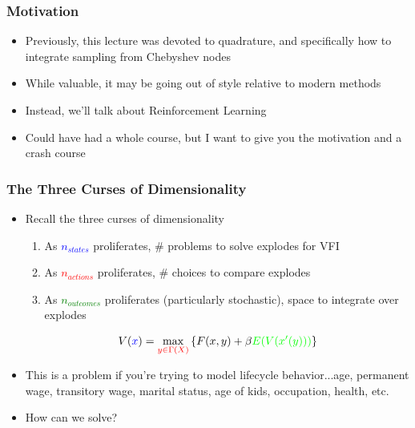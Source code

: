 \documentclass{beamer}
\author{Trevor Gallen}
\date{}
\begin{document}
\begin{frame}
\titlepage
\end{frame}

\begin{frame}
\frametitle[alignment=center]{Motivation}
\begin{itemize}
\item Previously, this lecture was devoted to quadrature, and specifically how to integrate sampling from Chebyshev nodes
\bigskip
\item While valuable, it may be going out of style relative to modern methods
\bigskip
\item Instead, we'll talk about Reinforcement Learning
\bigskip
\item Could have had a whole course, but I want to give you the motivation and a crash course
\end{itemize}
\end{frame}


\begin{frame}
\frametitle[alignment=center]{The Three Curses of Dimensionality}
\begin{itemize}
\item Recall the three curses of dimensionality
\begin{enumerate}
\item As \textcolor{blue}{$n_{states}$} proliferates, \# problems to solve explodes for VFI
\item As \textcolor{red}{$n_{actions}$} proliferates, \# choices to compare explodes
\item As \textcolor{green}{$n_{outcomes}$} proliferates (particularly stochastic), space to integrate over explodes
\end{enumerate}
$$V(\textcolor{blue}{x})=\max_{\textcolor{red}{y\in\Gamma(X)}}\left\{F(x,y)+\beta \textcolor{green}{E(V(x'(y)))}\right\}$$
\item This is a problem if you're trying to model lifecycle behavior...age, permanent wage, transitory wage, marital status, age of kids, occupation, health, etc.
\bigskip
\item How can we solve?
\end{itemize}
\end{frame}
\end{document}
